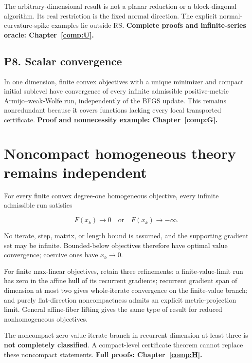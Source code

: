 The arbitrary-dimensional result is not a planar reduction or a block-diagonal algorithm. Its real restriction is the fixed normal direction. The explicit normal-curvature-spike examples lie outside RS. \textbf{Complete proofs and infinite-series oracle: Chapter~\ref{comp:U}.}



\subsection{P8. Scalar convergence}\label{p8.-scalar-convergence}

In one dimension, finite convex objectives with a unique minimizer and compact initial sublevel have convergence of every infinite admissible positive-metric Armijo--weak-Wolfe run, independently of the BFGS update. This remains nonredundant because it covers functions lacking every local transported certificate. \textbf{Proof and nonnecessity example: Chapter~\ref{comp:G}.}



\section{Noncompact homogeneous theory remains independent}\label{noncompact-homogeneous-theory-remains-independent}

For every finite convex degree-one homogeneous objective, every infinite admissible run satisfies

\[F(x_k)\to0\quad\text{or}\quad F(x_k)\to-\infty.\]

No iterate, step, matrix, or length bound is assumed, and the supporting gradient set may be infinite. Bounded-below objectives therefore have optimal value convergence; coercive ones have \(x_k\to0\).

For finite max-linear objectives, retain three refinements: a finite-value-limit run has zero in the affine hull of its recurrent gradients; recurrent gradient span of dimension at most two gives whole-iterate convergence on the finite-value branch; and purely flat-direction noncompactness admits an explicit metric-projection limit. General affine-fiber lifting gives the same type of result for reduced nonhomogeneous objectives.

The noncompact zero-value iterate branch in recurrent dimension at least three is \textbf{not completely classified}. A compact-level certificate theorem cannot replace these noncompact statements. \textbf{Full proofs: Chapter~\ref{comp:H}.}

